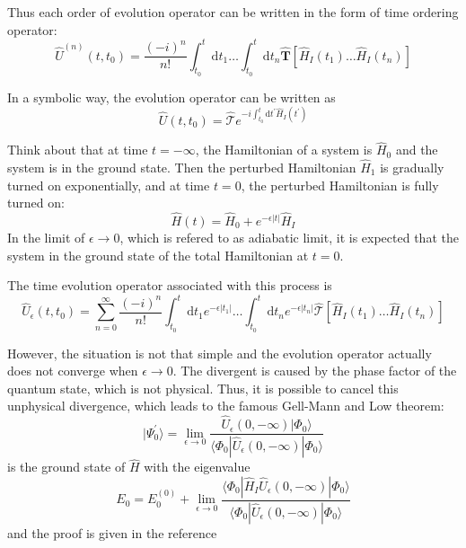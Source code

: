 Thus each order of evolution operator can be written in the form of time ordering operator:
\begin{equation}
\hat{U}^{(n)}\left(t, t_{0}\right)=\frac{(-i)^{n}}{n !} \int_{t_{0}}^{t} \mathrm{d} t_{1} \ldots \int_{t_{0}}^{t} \mathrm{d} t_{n} \hat{\boldsymbol{T}}\left[\hat{H}_{I}\left(t_{1}\right) \ldots \hat{H}_{I}\left(t_{n}\right)\right]
\end{equation}

In a symbolic way, the evolution operator can be written as
\begin{equation}
\hat{U}\left(t, t_{0}\right)=\hat{\mathcal{T}} e^{-i \int_{t_{0}}^{t} \mathrm{d} t^{\prime} \hat{H}_{I}\left(t^{\prime}\right)}
\end{equation}

Think about that at time $t=-\infty$, the Hamiltonian of a system is $\hat{H}_0$ and the system is in the ground state.
Then the perturbed Hamiltonian $\hat{H}_1$ is gradually turned on exponentially, and at time $t=0$, the perturbed Hamiltonian is fully turned on:
\begin{equation}
\hat{H}(t)=\hat{H}_{0}+e^{-\epsilon|t|} \hat{H}_{I}
\end{equation}
In the limit of $\epsilon \rightarrow 0$, which is refered to as adiabatic limit, it is expected that the system in the ground state of the total Hamiltonian at $t=0$.

The time evolution operator associated with this process is
\begin{equation}
\hat{U}_{\epsilon}\left(t, t_{0}\right)=\sum_{n=0}^{\infty} \frac{(-i)^{n}}{n !} \int_{t_{0}}^{t} \mathrm{d} t_{1} e^{-\epsilon|t_{1}|} \ldots \int_{t_{0}}^{t} \mathrm{d} t_{n} e^{-\epsilon|t_{n}|} \hat{\mathcal{T}}\left[\hat{H}_{I}\left(t_{1}\right) \ldots \hat{H}_{I}\left(t_{n}\right)\right]
\end{equation}

However, the situation is not that simple and the evolution operator actually does not converge when $\epsilon \rightarrow 0$.
The divergent is caused by the phase factor of the quantum state, which is not physical.
Thus, it is possible to cancel this unphysical divergence, which leads to the famous Gell-Mann and Low theorem:
\begin{equation}
| \Psi_{0}^{\prime} \rangle=\lim _{\epsilon \rightarrow 0} \frac{\hat{U}_{\epsilon}(0,-\infty) | \Phi_{0} \rangle}{\langle\Phi_{0}|\hat{U}_{\epsilon}(0,-\infty)| \Phi_{0}\rangle}
\end{equation}
is the ground state of $\hat{H}$ with the eigenvalue
\begin{equation}
E_{0}=E_{0}^{(0)}+\lim _{\epsilon \rightarrow 0} \frac{\langle\Phi_{0}|\hat{H}_{I} \hat{U}_{\epsilon}(0,-\infty)| \Phi_{0}\rangle}{\langle\Phi_{0}|\hat{U}_{\epsilon}(0,-\infty)| \Phi_{0}\rangle}
\end{equation}
and the proof is given in the reference \cite{gallmannlow}

